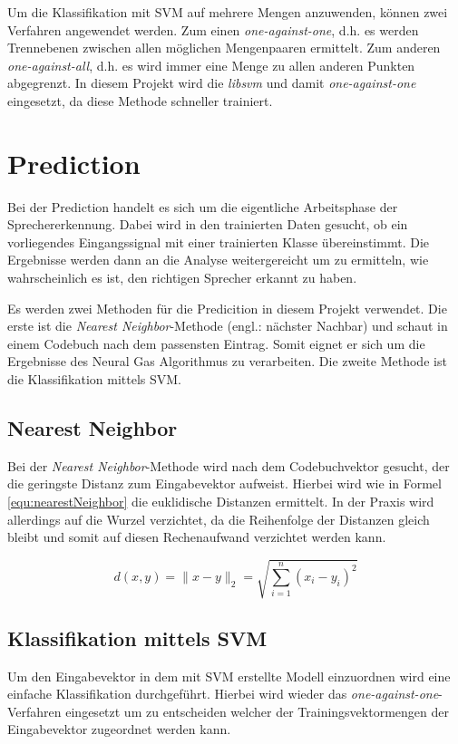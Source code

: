 Um die Klassifikation mit SVM auf mehrere Mengen anzuwenden, können zwei Verfahren angewendet werden. Zum einen \emph{one-against-one}, d.h. es werden Trennebenen zwischen allen möglichen Mengenpaaren ermittelt. Zum anderen \emph{one-against-all}, d.h. es wird immer eine Menge zu allen anderen Punkten abgegrenzt. In diesem Projekt wird die \emph{libsvm} und damit \emph{one-against-one} eingesetzt, da diese Methode schneller trainiert. \cite{bib:svmB}

\section{Prediction}
Bei der Prediction handelt es sich um die eigentliche Arbeitsphase der Sprechererkennung. Dabei wird in den trainierten Daten gesucht, ob ein vorliegendes Eingangssignal mit einer trainierten Klasse übereinstimmt. Die Ergebnisse werden dann an die Analyse weitergereicht um zu ermitteln, wie wahrscheinlich es ist, den richtigen Sprecher erkannt zu haben.

Es werden zwei Methoden für die Predicition in diesem Projekt verwendet. Die erste ist die \emph{Nearest Neighbor}-Methode (engl.: nächster Nachbar) und schaut in einem Codebuch nach dem passensten Eintrag. Somit eignet er sich um die Ergebnisse des Neural Gas Algorithmus zu verarbeiten. Die zweite Methode ist die Klassifikation mittels SVM.

\subsection{Nearest Neighbor}
Bei der \emph{Nearest Neighbor}-Methode wird nach dem Codebuchvektor gesucht, der die geringste Distanz zum Eingabevektor aufweist. Hierbei wird wie in Formel \ref{equ:nearestNeighbor} die euklidische Distanzen ermittelt. In der Praxis wird allerdings auf die Wurzel verzichtet, da die Reihenfolge der Distanzen gleich bleibt und somit auf diesen Rechenaufwand verzichtet werden kann.

\begin{equation}
	\label{equ:nearestNeighbor}
	d(x,y) = \|x-y\|_2 = \sqrt{\sum_{i=1}^n (x_i-y_i)^2}
\end{equation}

\subsection{Klassifikation mittels SVM}
Um den Eingabevektor in dem mit SVM erstellte Modell einzuordnen wird eine einfache Klassifikation durchgeführt. Hierbei wird wieder das \emph{one-against-one}-Verfahren eingesetzt um zu entscheiden welcher der Trainingsvektormengen der Eingabevektor zugeordnet werden kann.

